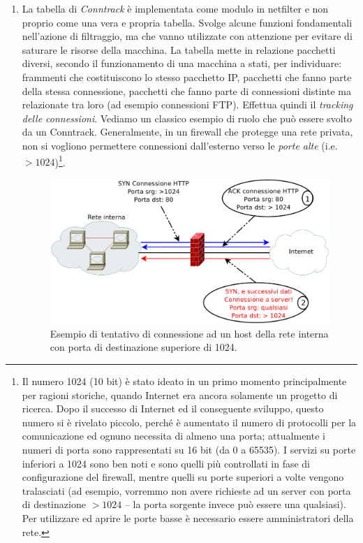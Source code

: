\begin{enumerate}
\item La tabella di \textit{Conntrack} è implementata come modulo in netfilter e non proprio come una vera e propria tabella. Svolge alcune funzioni fondamentali nell'azione di filtraggio, ma che vanno utilizzate con attenzione per evitare di saturare le risorse della macchina. La tabella mette in relazione pacchetti diversi, secondo il funzionamento di una macchina a stati, per individuare: frammenti che costituiscono lo stesso pacchetto IP, pacchetti che fanno parte della stessa connessione, pacchetti che fanno parte di connessioni distinte ma relazionate tra loro (ad esempio connessioni FTP). Effettua quindi il \textit{tracking delle connessioni}. Vediamo un classico esempio di ruolo che può essere svolto da un Conntrack. Generalmente, in un firewall che protegge una rete privata, non si vogliono permettere connessioni dall'esterno verso le \textit{porte alte} (i.e. $>1024$)\footnote{Il numero 1024 (10 bit) è stato ideato in un primo momento principalmente per ragioni storiche, quando Internet era ancora solamente un progetto di ricerca. Dopo il successo di Internet ed il conseguente sviluppo, questo numero si è rivelato piccolo, perché è aumentato il numero di protocolli per la comunicazione ed ognuno necessita di almeno una porta; attualmente i numeri di porta sono rappresentati su 16 bit (da 0 a 65535). I servizi su porte inferiori a 1024 sono ben noti e sono quelli più controllati in fase di configurazione del firewall, mentre quelli su porte superiori a volte vengono tralasciati (ad esempio, vorremmo non avere richieste ad un server con porta di destinazione $>1024$ -- la porta sorgente invece può essere una qualsiasi). Per utilizzare ed aprire le porte basse è necessario essere amministratori della rete.}.
\begin{figure}[htbp]
	\centering
	\includegraphics[scale = 0.3]{images/conntrack-example}
	\caption{Esempio di tentativo di connessione ad un host della rete interna con porta di destinazione superiore di 1024.}

\end{figure}
\end{enumerate}
